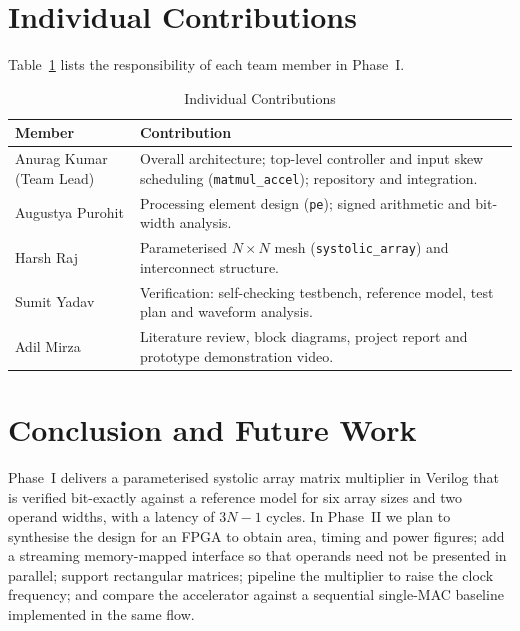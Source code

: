 \documentclass[conference]{IEEEtran}
\begin{document}
\section{Individual Contributions}
Table~\ref{tab:contrib} lists the responsibility of each team member in
Phase~I.

\begin{table}[t]
\caption{Individual Contributions}
\label{tab:contrib}
\centering
\begin{tabular}{p{2.7cm}p{5.1cm}}
\toprule
Member & Contribution \\
\midrule
Anurag Kumar (Team Lead) & Overall architecture; top-level controller and
input skew scheduling (\texttt{matmul\_accel}); repository and integration. \\
Augustya Purohit & Processing element design (\texttt{pe}); signed arithmetic
and bit-width analysis. \\
Harsh Raj & Parameterised $N \times N$ mesh (\texttt{systolic\_array}) and
interconnect structure. \\
Sumit Yadav & Verification: self-checking testbench, reference model, test
plan and waveform analysis. \\
Adil Mirza & Literature review, block diagrams, project report and prototype
demonstration video. \\
\bottomrule
\end{tabular}
\end{table}

\section{Conclusion and Future Work}
Phase~I delivers a parameterised systolic array matrix multiplier in Verilog
that is verified bit-exactly against a reference model for six array sizes and
two operand widths, with a latency of $3N-1$ cycles. In Phase~II we plan to
synthesise the design for an FPGA to obtain area, timing and power figures; add
a streaming memory-mapped interface so that operands need not be presented in
parallel; support rectangular matrices; pipeline the multiplier to raise the
clock frequency; and compare the accelerator against a sequential single-MAC
baseline implemented in the same flow.
\end{document}
